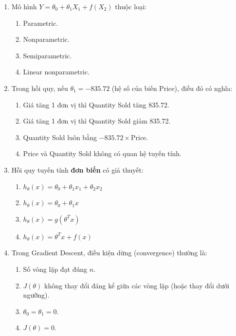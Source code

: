 \documentclass[10pt]{article}
\begin{document}
\begin{enumerate}[leftmargin=*, label=\textbf{Câu \arabic*.}]
    \item Mô hình $Y = \theta_0 + \theta_1 X_1 + f(X_2)$ thuộc loại:
    \begin{enumerate}[label=\Alph*.]
        \item Parametric.
        \item Nonparametric.
        \item Semiparametric.
        \item Linear nonparametric.
    \end{enumerate}

    \item Trong hồi quy, nếu $\theta_1 = -835.72$ (hệ số của biến Price), điều đó có nghĩa:
    \begin{enumerate}[label=\Alph*.]
        \item Giá tăng 1 đơn vị thì Quantity Sold tăng 835.72.
        \item Giá tăng 1 đơn vị thì Quantity Sold giảm 835.72.
        \item Quantity Sold luôn bằng $-835.72 \times \text{Price}$.
        \item Price và Quantity Sold không có quan hệ tuyến tính.
    \end{enumerate}

    \item Hồi quy tuyến tính \textbf{đơn biến} có giả thuyết:
    \begin{enumerate}[label=\Alph*.]
        \item $h_\theta(x) = \theta_0 + \theta_1 x_1 + \theta_2 x_2$
        \item $h_\theta(x) = \theta_0 + \theta_1 x$
        \item $h_\theta(x) = g(\theta^T x)$
        \item $h_\theta(x) = \theta^T x + f(x)$
    \end{enumerate}

    \item Trong Gradient Descent, điều kiện dừng (convergence) thường là:
    \begin{enumerate}[label=\Alph*.]
        \item Số vòng lặp đạt đúng $n$.
        \item $J(\theta)$ không thay đổi đáng kể giữa các vòng lặp (hoặc thay đổi dưới ngưỡng).
        \item $\theta_0 = \theta_1 = 0$.
        \item $J(\theta) = 0$.
    \end{enumerate}


\end{enumerate}
\end{document}
